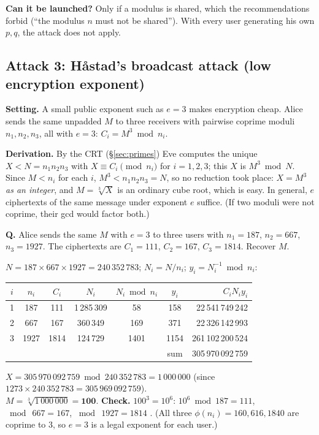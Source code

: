 \textbf{Can it be launched?} Only if a modulus is shared, which the recommendations forbid (``the modulus $n$ must not be shared''). With every user generating his own $p, q$, the attack does not apply.

\subsection{Attack 3: H\aa stad's broadcast attack (low encryption exponent) \hot\new}

\textbf{Setting.} A small public exponent such as $e = 3$ makes encryption cheap. Alice sends the same unpadded $M$ to three receivers with pairwise coprime moduli $n_1, n_2, n_3$, all with $e = 3$: $C_i = M^3 \bmod n_i$.

\textbf{Derivation.} By the CRT (\S\ref{sec:primes}) Eve computes the unique $X < N = n_1 n_2 n_3$ with $X \equiv C_i \pmod{n_i}$ for $i = 1, 2, 3$; this $X$ is $M^3 \bmod N$. Since $M < n_i$ for each $i$, $M^3 < n_1 n_2 n_3 = N$, so no reduction took place: $X = M^3$ \emph{as an integer}, and $M = \sqrt[3]{X}$ is an ordinary cube root, which is easy. In general, $e$ ciphertexts of the same message under exponent $e$ suffice. (If two moduli were not coprime, their gcd would factor both.)

\begin{worked}[: H\aa stad's attack with $e = 3$ (new)]
\textbf{Q.} Alice sends the same $M$ with $e = 3$ to three users with $n_1 = 187$, $n_2 = 667$, $n_3 = 1927$. The ciphertexts are $C_1 = 111$, $C_2 = 167$, $C_3 = 1814$. Recover $M$.

$N = 187 \times 667 \times 1927 = 240\,352\,783$; $N_i = N / n_i$; $y_i = N_i^{-1} \bmod n_i$:
\begin{center}\small
\begin{tabular}{@{}ccccccr@{}}
\toprule
$i$ & $n_i$ & $C_i$ & $N_i$ & $N_i \bmod n_i$ & $y_i$ & $C_i N_i y_i$\\
\midrule
1 & 187 & 111 & 1\,285\,309 & 58 & 158 & 22\,541\,749\,242\\
2 & 667 & 167 & 360\,349 & 169 & 371 & 22\,326\,142\,993\\
3 & 1927 & 1814 & 124\,729 & 1401 & 1154 & 261\,102\,200\,524\\
\midrule
 & & & & & sum & 305\,970\,092\,759\\
\bottomrule
\end{tabular}
\end{center}
$X = 305\,970\,092\,759 \bmod 240\,352\,783 = 1\,000\,000$ (since $1273 \times 240\,352\,783 = 305\,969\,092\,759$).\\
$M = \sqrt[3]{1\,000\,000} = \mathbf{100}$. \textbf{Check.} $100^3 = 10^6$: $10^6 \bmod 187 = 111$, $\bmod\ 667 = 167$, $\bmod\ 1927 = 1814$ \checkmark. (All three $\phi(n_i) = 160, 616, 1840$ are coprime to 3, so $e = 3$ is a legal exponent for each user.)
\end{worked}

